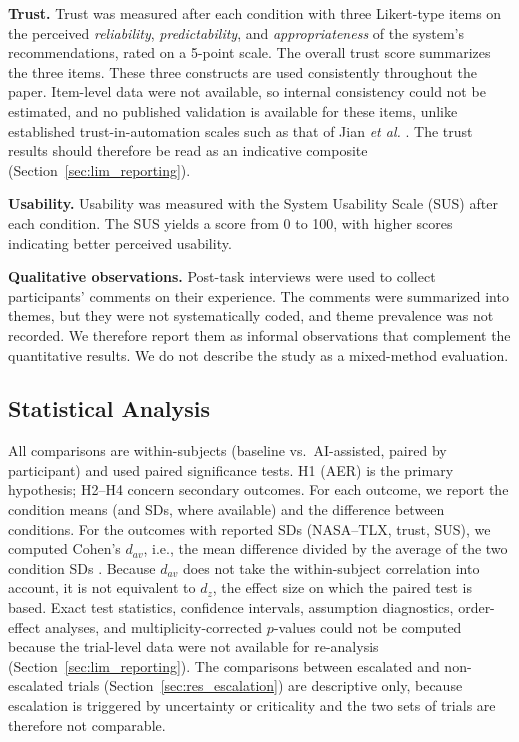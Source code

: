 \documentclass[journal]{IEEEtran}
\theoremstyle{plain}
\theoremstyle{definition}
\begin{document}
    \textbf{Trust.}
    Trust was measured after each condition with three Likert-type items on the perceived \emph{reliability}, \emph{predictability}, and \emph{appropriateness} of the system's recommendations, rated on a 5-point scale. The overall trust score summarizes the three items. These three constructs are used consistently throughout the paper. Item-level data were not available, so internal consistency could not be estimated, and no published validation is available for these items, unlike established trust-in-automation scales such as that of Jian \emph{et al.} \cite{Jian2000}. The trust results should therefore be read as an indicative composite (Section~\ref{sec:lim_reporting}).

    \textbf{Usability.}
    Usability was measured with the System Usability Scale (SUS) \cite{Brooke1996} after each condition. The SUS yields a score from 0 to 100, with higher scores indicating better perceived usability.

    \textbf{Qualitative observations.}
    Post-task interviews were used to collect participants' comments on their experience. The comments were summarized into themes, but they were not systematically coded, and theme prevalence was not recorded. We therefore report them as informal observations that complement the quantitative results. We do not describe the study as a mixed-method evaluation.

    \subsection{Statistical Analysis}
    All comparisons are within-subjects (baseline vs.\ AI-assisted, paired by participant) and used paired significance tests. H1 (AER) is the primary hypothesis; H2--H4 concern secondary outcomes. For each outcome, we report the condition means (and SDs, where available) and the difference between conditions. For the outcomes with reported SDs (NASA--TLX, trust, SUS), we computed Cohen's $d_{av}$, i.e., the mean difference divided by the average of the two condition SDs \cite{Lakens2013}. Because $d_{av}$ does not take the within-subject correlation into account, it is not equivalent to $d_z$, the effect size on which the paired test is based. Exact test statistics, confidence intervals, assumption diagnostics, order-effect analyses, and multiplicity-corrected $p$-values could not be computed because the trial-level data were not available for re-analysis (Section~\ref{sec:lim_reporting}). The comparisons between escalated and non-escalated trials (Section~\ref{sec:res_escalation}) are descriptive only, because escalation is triggered by uncertainty or criticality and the two sets of trials are therefore not comparable.
\end{document}
